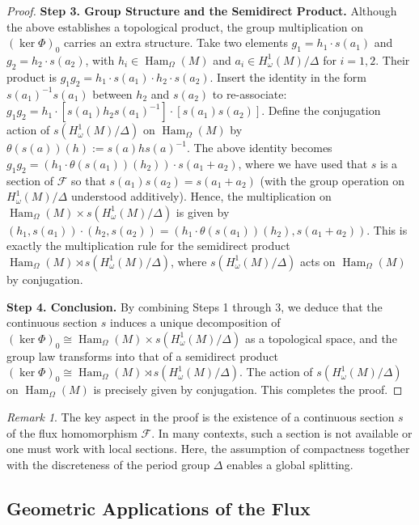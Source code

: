\documentclass[11pt,a4paper]{amsart}
\theoremstyle{definition}
\theoremstyle{remark}
\newtheorem{remark}[theorem]{Remark}
\newcommand{\Ham}{\operatorname{Ham}}
\begin{document}
\begin{proof}
		\textbf{Step 3. Group Structure and the Semidirect Product.}
		Although the above establishes a topological product, the group multiplication on $(\ker \Phi)_0$ carries an extra structure. Take two elements $g_1 = h_1 \cdot s(a_1)$ and $g_2 = h_2 \cdot s(a_2)$, with $h_i \in \Ham_\Omega(M)$ and $a_i \in H_\omega^1(M)/\Delta$ for $i=1,2$. Their product is $g_1g_2 = h_1 \cdot s(a_1) \cdot h_2 \cdot s(a_2)$. Insert the identity in the form $s(a_1)^{-1}s(a_1)$ between $h_2$ and $s(a_2)$ to re-associate: $g_1g_2 = h_1 \cdot [s(a_1) h_2 s(a_1)^{-1}] \cdot [s(a_1) s(a_2)]$. Define the conjugation action of $s(H_\omega^1(M)/\Delta)$ on $\Ham_\Omega(M)$ by $\theta(s(a))(h) := s(a) h s(a)^{-1}$. The above identity becomes $g_1g_2 = (h_1 \cdot \theta(s(a_1))(h_2)) \cdot s(a_1 + a_2)$, where we have used that $s$ is a section of $\mathcal{F}$ so that $s(a_1)s(a_2) = s(a_1+a_2)$ (with the group operation on $H_\omega^1(M)/\Delta$ understood additively). Hence, the multiplication on $\Ham_\Omega(M) \times s(H_\omega^1(M)/\Delta)$ is given by $(h_1, s(a_1)) \cdot (h_2, s(a_2)) = (h_1 \cdot \theta(s(a_1))(h_2), s(a_1+a_2))$. This is exactly the multiplication rule for the semidirect product $\Ham_\Omega(M) \rtimes s(H_\omega^1(M)/\Delta)$, where $s(H_\omega^1(M)/\Delta)$ acts on $\Ham_\Omega(M)$ by conjugation.
		
		\textbf{Step 4. Conclusion.}
		By combining Steps 1 through 3, we deduce that the continuous section $s$ induces a unique decomposition of $(\ker \Phi)_0 \cong \Ham_\Omega(M) \times s(H_\omega^1(M)/\Delta)$ as a topological space, and the group law transforms into that of a semidirect product $(\ker \Phi)_0 \cong \Ham_\Omega(M) \rtimes s(H_\omega^1(M)/\Delta)$. The action of $s(H_\omega^1(M)/\Delta)$ on $\Ham_\Omega(M)$ is precisely given by conjugation. This completes the proof.
	\end{proof}
	
	\begin{remark}
		The key aspect in the proof is the existence of a continuous section $s$ of the flux homomorphism $\mathcal{F}$. In many contexts, such a section is not available or one must work with local sections. Here, the assumption of compactness together with the discreteness of the period group $\Delta$ enables a global splitting.
	\end{remark}
	
	\subsection{Geometric Applications of the Flux}
	
\end{document}
